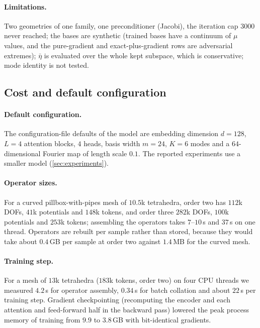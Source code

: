 \paragraph{Limitations.}
Two geometries of one family, one preconditioner (Jacobi), the iteration cap $3000$ never reached; the bases are synthetic (trained bases have a continuum of $\mu$ values, and the pure-gradient and exact-plus-gradient rows are adversarial extremes); $\bar\eta$ is evaluated over the whole kept subspace, which is conservative; mode identity is not tested.

\subsection{Cost and default configuration}\label{sec:A04-cost}

\paragraph{Default configuration.}
The configuration-file defaults of the model are embedding dimension $d=128$, $L=4$ attention blocks, $4$ heads, basis width $m=24$, $K=6$ modes and a $64$-dimensional Fourier map of length scale $0.1$.
The reported experiments use a smaller model (\cref{sec:experiments}).

\paragraph{Operator sizes.}
For a curved pillbox-with-pipes mesh of $10.5$k tetrahedra, order two has $112$k DOFs, $41$k potentials and $148$k tokens, and order three $282$k DOFs, $100$k potentials and $253$k tokens; assembling the operators takes $7$--$10$\,s and $37$\,s on one thread.
Operators are rebuilt per sample rather than stored, because they would take about $0.4$\,GB per sample at order two against $1.4$\,MB for the curved mesh.

\paragraph{Training step.}
For a mesh of $13$k tetrahedra ($183$k tokens, order two) on four CPU threads we measured $4.2$\,s for operator assembly, $0.34$\,s for batch collation and about $22$\,s per training step.
Gradient checkpointing (recomputing the encoder and each attention and feed-forward half in the backward pass) lowered the peak process memory of training from $9.9$ to $3.8$\,GB with bit-identical gradients.

